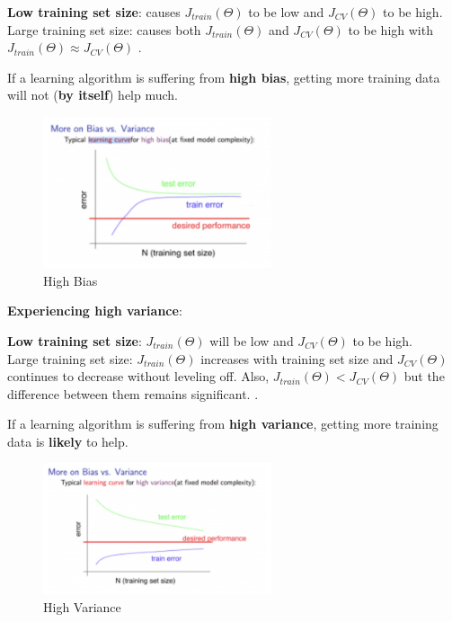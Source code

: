 \begin{tcolorbox}[width=\textwidth,colback={white},colbacktitle=white]
\textbf{Low training set size}: causes $ J_{train}(\Theta) $  to be low and $ J_{CV}(\Theta) $  to be high.\\

Large training set size: causes both $ J_{train}(\Theta) $  and $ J_{CV}(\Theta) $  to be high with $ J_{train}(\Theta) \approx  J_{CV}(\Theta) $ .
\end{tcolorbox}

If a learning algorithm is suffering from \textbf{high bias}, getting more training data will not (\textbf{by itself}) help much.\\

\begin{figure}[h!]
	\centering
	\includegraphics[width=0.6\textwidth]{fig/bias}
	\caption{High Bias}
\end{figure}

\pagebreak

\textbf{Experiencing high variance}:\\

\begin{tcolorbox}[width=\textwidth,colback={white},colbacktitle=white]
\textbf{Low training set size}: $ J_{train}(\Theta) $  will be low and $ J_{CV}(\Theta) $  to be high.\\

Large training set size: $ J_{train}(\Theta) $  increases with training set size and $ J_{CV}(\Theta) $  continues to decrease without leveling off. Also, $ J_{train}(\Theta) <  J_{CV}(\Theta) $ but the difference between them remains significant. .
\end{tcolorbox}

If a learning algorithm is suffering from \textbf{high variance}, getting more training data is \textbf{likely} to help.

\begin{figure}[h!]
	\centering
	\includegraphics[width=0.6\textwidth]{fig/variance}
	\caption{High Variance}
\end{figure}

